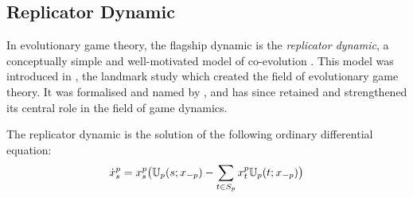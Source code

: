 \documentclass[preprint,authoryear]{elsarticle}
\begin{document}


\subsection{Replicator Dynamic} \label{sec: replicator}

In evolutionary game theory, the flagship dynamic is the \emph{replicator dynamic}, a conceptually simple and well-motivated model of co-evolution \citep{hofbauer_evolutionary_2003,sandholm2010population}. This model was introduced in \cite{smith1973logic}, the landmark study which created the field of evolutionary game theory. It was formalised and named by \cite{taylor_evolutionary_1978}, and has since retained and strengthened its central role in the field of game dynamics.
\begin{defn}
    The replicator dynamic is the solution of the following ordinary differential equation:
    \begin{equation}
\dot x_s^p = x_s^p\big (\mathbb{U}_p(s; x_{-p}) - \sum_{t\in S_p} x_t^p \mathbb{U}_p(t; x_{-p}) \big )
\end{equation}
\end{defn}

\end{document}
